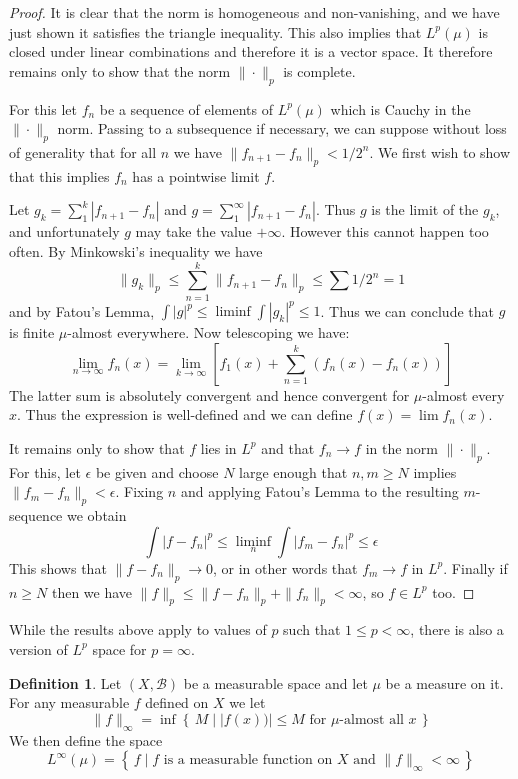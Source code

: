 \documentclass[11pt,oneside]{amsbook}
\newcommand{\set}[1]{\left\{\,#1\,\right\}}
\theoremstyle{definition}
\theoremstyle{plain}
\theoremstyle{definition}
\newtheorem{defn}[thm]{Definition}
\theoremstyle{remark}
\numberwithin{equation}{section}
\numberwithin{figure}{section}
\begin{document}
\begin{proof}
  It is clear that the norm is homogeneous and non-vanishing, and we have just shown it satisfies the triangle inequality. This also implies that $L^p(\mu)$ is closed under linear combinations and therefore it is a vector space. It therefore remains only to show that the norm $\|\cdot\|_p$ is complete.

  For this let $f_n$ be a sequence of elements of $L^p(\mu)$ which is Cauchy in the $\|\cdot\|_p$ norm. Passing to a subsequence if necessary, we can suppose without loss of generality that for all $n$ we have $\|f_{n+1}-f_n\|_p<1/2^n$. We first wish to show that this implies $f_n$ has a pointwise limit $f$.

  Let $g_k=\sum_1^k|f_{n+1}-f_n|$ and $g=\sum_1^\infty|f_{n+1}-f_n|$. Thus $g$ is the limit of the $g_k$, and unfortunately $g$ may take the value $+\infty$. However this cannot happen too often. By Minkowski's inequality we have
  \[\|g_k\|_p\leq\sum_{n=1}^k\|f_{n+1}-f_n\|_p\leq\sum1/2^n=1
  \]
  and by Fatou's Lemma, $\int|g|^p\leq\liminf\int|g_k|^p\leq1$. Thus we can conclude that $g$ is finite $\mu$-almost everywhere. Now telescoping we have:
  \[\lim_{n\to\infty} f_n(x)=\lim_{k\to\infty}\left[f_1(x)
      +\sum_{n=1}^k(f_n(x)-f_n(x))\right]
  \]
  The latter sum is absolutely convergent and hence convergent for $\mu$-almost every $x$. Thus the expression is well-defined and we can define $f(x)=\lim f_n(x)$.

  It remains only to show that $f$ lies in $L^p$ and that $f_n\to f$ in the norm $\|\cdot\|_p$. For this, let $\epsilon$ be given and choose $N$ large enough that $n,m\geq N$ implies $\|f_m-f_n\|_p<\epsilon$. Fixing $n$ and applying Fatou's Lemma to the resulting $m$-sequence we obtain
  \[\int|f-f_n|^p\leq\liminf_n\int|f_m-f_n|^p\leq\epsilon
  \]
  This shows that $\|f-f_n\|_p\to0$, or in other words that $f_m\to f$ in $L^p$. Finally if $n\geq N$ then we have $\|f\|_p\leq\|f-f_n\|_p+\|f_n\|_p<\infty$, so $f\in L^p$ too.
\end{proof}

While the results above apply to values of $p$ such that $1\leq p<\infty$, there is also a version of $L^p$ space for $p=\infty$.

\begin{defn}
  Let $(X,\mathcal B)$ be a measurable space and let $\mu$ be a measure on it. For any measurable $f$ defined on $X$ we let
  \[\|f\|_\infty=\inf\set{M\mid |f(x))|\leq M\text{ for $\mu$-almost all $x$}}
  \]
  We then define the space
  \[L^\infty(\mu)=\set{f\mid\text{$f$ is a measurable function on $X$ and } \|f\|_\infty<\infty}
  \]
\end{defn}
\end{document}
